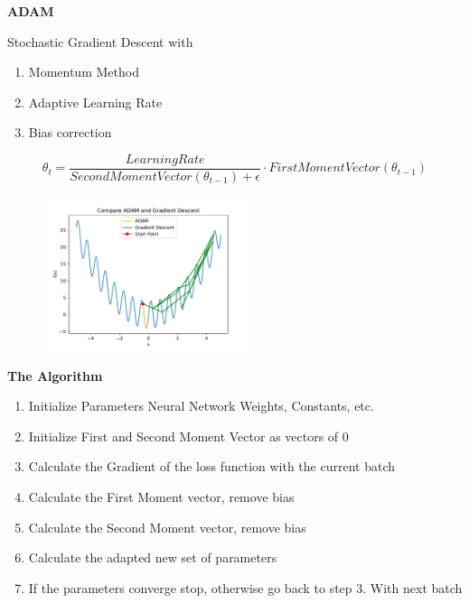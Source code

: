 \documentclass{beamer}
\newcommand\myheading[1]{%
  \par\bigskip
  {\Large\bfseries#1}\par\smallskip}
\begin{document}
\begin{frame}
    \myheading{ADAM}
    Stochastic Gradient Descent with
    \begin{enumerate}
        \item Momentum Method
        \item Adaptive Learning Rate
        \item Bias correction
    \end{enumerate}
    \newline
    $$\theta_t = \frac{LearningRate}{Second Moment Vector(\theta_{t-1}) + \epsilon} \cdot FirstMomentVector(\theta_{t-1})$$
    \begin{figure}[h]
        \includegraphics[width=6cm]{report/figures/adam_vs_gradientdescent.pdf}
    \end{figure}
\end{frame}

\begin{frame}
    \myheading{The Algorithm}
    \begin{enumerate}
        \item Initialize Parameters
        Neural Network Weights, Constants, etc.
        \item Initialize First and Second Moment Vector as vectors of 0
        \item Calculate the Gradient of the loss function with the current batch
        \item Calculate the First Moment vector, remove bias
        \item Calculate the Second Moment vector, remove bias
        \item Calculate the adapted new set of parameters
        \item If the parameters converge stop, otherwise go back to step 3. With next batch
    \end{enumerate}
\end{frame}
\end{document}
